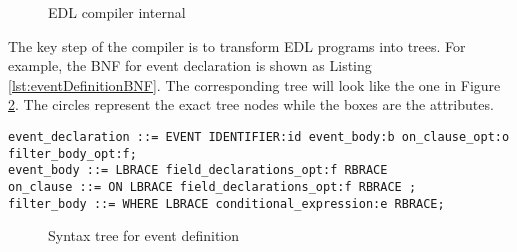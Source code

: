 \begin{figure}
\centering
{}
\caption{EDL compiler internal}
\label{fig:compilerinternal}
\end{figure}

The key step of the compiler is to transform EDL programs into trees. For example, the BNF for event declaration is shown as Listing \ref{lst:eventDefinitionBNF}. The corresponding tree will look like the one in Figure \ref{fig:eventDefinitionTree}. The circles represent the exact tree nodes while the boxes are the attributes.

\begin{lstlisting}[caption=BNF for event definition, label=lst:eventDefinitionBNF]
event_declaration ::= EVENT IDENTIFIER:id event_body:b on_clause_opt:o filter_body_opt:f;
event_body ::= LBRACE field_declarations_opt:f RBRACE
on_clause ::= ON LBRACE field_declarations_opt:f RBRACE	;
filter_body ::=	WHERE LBRACE conditional_expression:e RBRACE;
\end{lstlisting}

\begin{figure}
\centering
{}
\caption{Syntax tree for event definition}
\label{fig:eventDefinitionTree}
\end{figure}